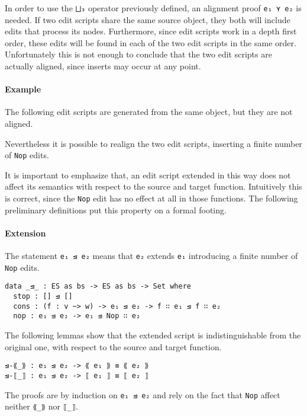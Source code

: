 \documentclass[../Thesis.tex]{subfiles}
\begin{document}
	In order to use the \texttt{⨆₃} operator previously defined, an alignment
	proof \texttt{e₁ ⋎ e₂} is needed.
	If two edit scripts share the same source object, they both will include 
	edits that process its nodes. Furthermore, since edit scripts work 
	in a depth first order, these edits will be found in each 
	of the two edit scripts in the same order.
	Unfortunately this is not enough to conclude that the two edit scripts 
	are actually aligned, since inserts may occur at any point.
	
	\paragraph{Example}
	The following edit scripts are generated from the same object,
	but they are not aligned.
	
	Nevertheless it is possible to realign the two edit scripts, inserting
	a finite number of \texttt{Nop} edits.
	
	It is important to emphasize that, an edit script extended in this way
	does not affect its semantics with respect to the source and target function.
	Intuitively this is correct, since the \texttt{Nop} edit has no effect at all
	in those functions.
	The following preliminary definitions put this property on a formal footing.

	\paragraph{Extension}
	\label{par:Extension}
	The statement \texttt{e₁ ⊴ e₂} means that \texttt{e₂} extends \texttt{e₁}
	introducing a finite number of \texttt{Nop} edits.
	
\begin{verbatim}
data _⊴_ : ES as bs -> ES as bs -> Set where
  stop : [] ⊴ []
  cons : (f : v ~> w) -> e₁ ⊴ e₂ -> f ∷ e₁ ⊴ f ∷ e₂
  nop : e₁ ⊴ e₂ -> e₁ ⊴ Nop ∷ e₂
\end{verbatim}
		
	The following lemmas show that the extended script is 
	indistinguishable from the original one, with respect to
	the source and target function.
	
\begin{verbatim}
⊴-⟪_⟫ : e₁ ⊴ e₂ -> ⟪ e₁ ⟫ ≡ ⟪ e₂ ⟫
⊴-⟦_⟧ : e₁ ⊴ e₂ -> ⟦ e₁ ⟧ ≡ ⟦ e₂ ⟧
\end{verbatim}

	The proofs are by induction on \texttt{e₁ ⊴ e₂} and rely on the fact that
	\texttt{Nop} affect neither \texttt{⟪\_⟫} nor \texttt{⟦\_⟧}.
	
\end{document}
